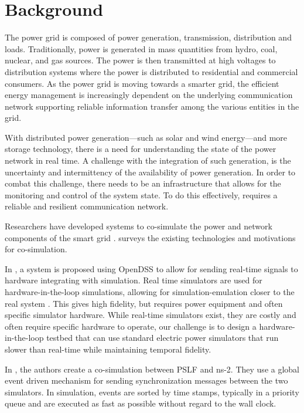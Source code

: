 \section{Background}
\label{background}

The power grid is composed of power generation, transmission, distribution and loads. Traditionally, power is generated in mass quantities from hydro, coal, nuclear, and gas sources. The power is then transmitted at high voltages to distribution systems where the power is distributed to residential and commercial consumers. As the power grid is moving towards a smarter grid, the efficient energy management is increasingly dependent on the underlying communication network supporting reliable information transfer among the various entities in the grid.

With distributed power generation---such as solar and wind energy---and more storage technology, there is a need for understanding the state of the power network in real time. A challenge with the integration of such generation, is the uncertainty and intermittency of the availability of power generation.
In order to combat this challenge, there needs to be an infrastructure that allows for the monitoring and control of the system state. To do this effectively, requires a reliable and resilient communication network.

Researchers have developed systems to co-simulate the power and network components of the smart grid \cite{DSSco-sim, DSS-RT-HIL, RT-SmartGrid, GECO, EPOCHS, FNCS, FNCS-algos}. \cite{Mets2014} surveys the existing technologies and motivations for co-simulation.

In \cite{DSS-RT-HIL}, a system is proposed using OpenDSS to allow for sending real-time signals to hardware integrating with simulation.
Real time simulators are used for hardware-in-the-loop simulations, allowing for simulation-emulation closer to the real system \cite{RT-SmartGrid}. This gives high fidelity, but requires power equipment and often specific simulator hardware.
While real-time simulators exist, they are costly and often require specific hardware to operate, our challenge is to design a hardware-in-the-loop testbed that can use standard electric power simulators that run slower than real-time while maintaining temporal fidelity.

In \cite{GECO}, the authors create a co-simulation between PSLF and ns-2.
They use a global event driven mechanism for sending synchronization messages between the two simulators.
In simulation, events are sorted by time stamps, typically in a priority queue and are executed as fast as possible without regard to the wall clock.

